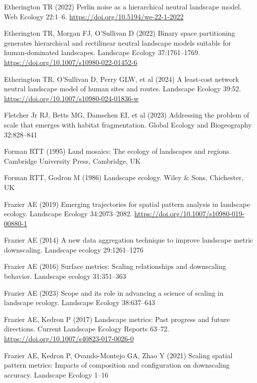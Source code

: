 \documentclass[
  10pt,
  a4paperpaper,
]{article}
\newlength{\cslhangindent}
\newenvironment{CSLReferences}[2] %
 {\begin{list}{}{%
  \setlength{\itemindent}{0pt}
  \setlength{\leftmargin}{0pt}
  \setlength{\parsep}{0pt}
  \ifodd #1
   \setlength{\leftmargin}{\cslhangindent}
   \setlength{\itemindent}{-1\cslhangindent}
  \fi
  \setlength{\itemsep}{#2\baselineskip}}}
 {\end{list}}
\begin{document}
\begin{CSLReferences}{1}{1}
Etherington TR (2022) Perlin noise as a hierarchical neutral landscape
model. Web Ecology 22:1--6. \url{https://doi.org/10.5194/we-22-1-2022}

Etherington TR, Morgan FJ, O'Sullivan D (2022) Binary space partitioning
generates hierarchical and rectilinear neutral landscape models suitable
for human-dominated landscapes. Landscape Ecology 37:1761--1769.
\url{https://doi.org/10.1007/s10980-022-01452-6}

Etherington TR, O'Sullivan D, Perry GLW, et al (2024) A least-cost
network neutral landscape model of human sites and routes. Landscape
Ecology 39:52. \url{https://doi.org/10.1007/s10980-024-01836-w}

Fletcher Jr RJ, Betts MG, Damschen EI, et al (2023) Addressing the
problem of scale that emerges with habitat fragmentation. Global Ecology
and Biogeography 32:828--841

Forman RTT (1995) Land mosaics: The ecology of landscapes and regions.
Cambridge University Press, Cambridge, UK

Forman RTT, Godron M (1986) Landscape ecology. Wiley \& Sons,
Chichester, UK

Frazier AE (2019) Emerging trajectories for spatial pattern analysis in
landscape ecology. Landscape Ecology 34:2073--2082.
\url{https://doi.org/10.1007/s10980-019-00880-1}

Frazier AE (2014) A new data aggregation technique to improve landscape
metric downscaling. Landscape ecology 29:1261--1276

Frazier AE (2016) Surface metrics: Scaling relationships and downscaling
behavior. Landscape ecology 31:351--363

Frazier AE (2023) Scope and its role in advancing a science of scaling
in landscape ecology. Landscape Ecology 38:637--643

Frazier AE, Kedron P (2017) Landscape metrics: Past progress and future
directions. Current Landscape Ecology Reports 63--72.
\url{https://doi.org/10.1007/s40823-017-0026-0}

Frazier AE, Kedron P, Ovando-Montejo GA, Zhao Y (2021) Scaling spatial
pattern metrics: Impacts of composition and configuration on downscaling
accuracy. Landscape Ecology 1--16


\end{CSLReferences}
\end{document}
